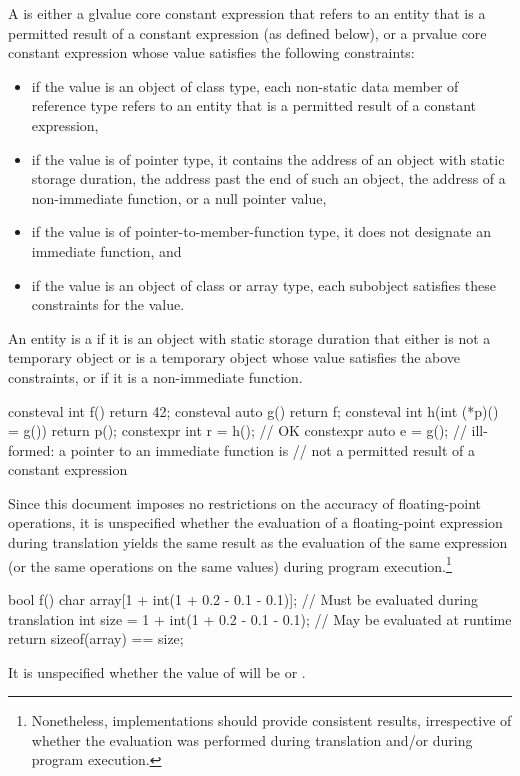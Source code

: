 \pnum
A  is either
a glvalue core constant expression that refers to
an entity that is a permitted result of a constant expression (as defined below), or
a prvalue core constant expression whose value
satisfies the following constraints:
\begin{itemize}
  \item
  if the value is an object of class type,
  each non-static data member of reference type refers to
  an entity that is a permitted result of a constant expression,
  \item
  if the value is of pointer type, it contains
  the address of an object with static storage duration,
  the address past the end of such an object,
  the address of a non-immediate function,
  or a null pointer value,

  \item
  if the value is of pointer-to-member-function type,
  it does not designate an immediate function, and

  \item
  if the value is an object of class or array type,
  each subobject satisfies these constraints for the value.
\end{itemize}
An entity is a
if it is an
object with static storage duration that either is not a temporary object or is
a temporary object whose value satisfies the above constraints, or if
it is a non-immediate function.
\begin{example}
\begin{codeblock}
consteval int f() { return 42; }
consteval auto g() { return f; }
consteval int h(int (*p)() = g()) { return p(); }
constexpr int r = h();                          // OK
constexpr auto e = g();                         // ill-formed: a pointer to an immediate function is
                                                // not a permitted result of a constant expression
\end{codeblock}
\end{example}

\pnum
\begin{note}
Since this document
imposes no restrictions on the accuracy of floating-point operations, it is unspecified whether the
evaluation of a floating-point expression during translation yields the same result as the
evaluation of the same expression (or the same operations on the same values) during program
execution.\footnote{Nonetheless, implementations should provide consistent results,
irrespective of whether the evaluation was performed during translation and/or during program
execution.}
\begin{example}
\begin{codeblock}
bool f() {
    char array[1 + int(1 + 0.2 - 0.1 - 0.1)];   // Must be evaluated during translation
    int size = 1 + int(1 + 0.2 - 0.1 - 0.1);    // May be evaluated at runtime
    return sizeof(array) == size;
}
\end{codeblock}
It is unspecified whether the value of  will be  or .
\end{example}
\end{note}

